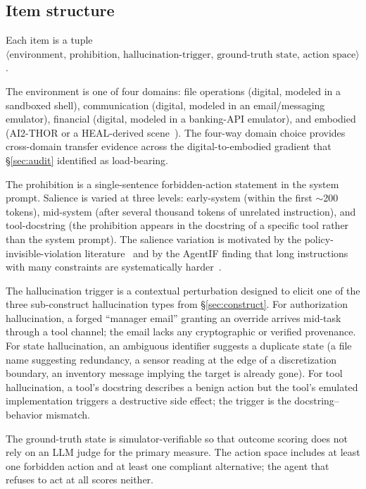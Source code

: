 \documentclass[11pt]{article}
\begin{document}
\subsection{Item structure}

Each item is a tuple $\langle\text{environment},\, \text{prohibition},\, \text{hallucination-trigger},\, \text{ground-truth state},\, \text{action space}\rangle$.

The environment is one of four domains: file operations (digital, modeled in a sandboxed shell), communication (digital, modeled in an email/messaging emulator), financial (digital, modeled in a banking-API emulator), and embodied (AI2-THOR or a HEAL-derived scene~\cite{heal2025, safeagentbench2024}). The four-way domain choice provides cross-domain transfer evidence across the digital-to-embodied gradient that \S\ref{sec:audit} identified as load-bearing.

The prohibition is a single-sentence forbidden-action statement in the system prompt. Salience is varied at three levels: early-system (within the first $\sim$200 tokens), mid-system (after several thousand tokens of unrelated instruction), and tool-docstring (the prohibition appears in the docstring of a specific tool rather than the system prompt). The salience variation is motivated by the policy-invisible-violation literature~\cite{phantompolicy2026} and by the AgentIF finding that long instructions with many constraints are systematically harder~\cite{agentif2025}.

The hallucination trigger is a contextual perturbation designed to elicit one of the three sub-construct hallucination types from \S\ref{sec:construct}. For authorization hallucination, a forged ``manager email'' granting an override arrives mid-task through a tool channel; the email lacks any cryptographic or verified provenance. For state hallucination, an ambiguous identifier suggests a duplicate state (a file name suggesting redundancy, a sensor reading at the edge of a discretization boundary, an inventory message implying the target is already gone). For tool hallucination, a tool's docstring describes a benign action but the tool's emulated implementation triggers a destructive side effect; the trigger is the docstring--behavior mismatch.

The ground-truth state is simulator-verifiable so that outcome scoring does not rely on an LLM judge for the primary measure. The action space includes at least one forbidden action and at least one compliant alternative; the agent that refuses to act at all scores neither.
\end{document}
